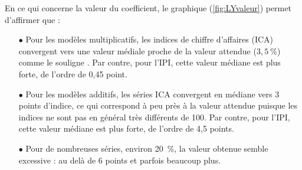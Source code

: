 \documentclass[12pt, a4paper, french]{article}
\begin{document}
En ce qui concerne la valeur du coefficient, le graphique (\ref{fig:LYvaleur}) permet d'affirmer que :
\begin{itemize}
	\item[$\bullet$] Pour les modèles multiplicatifs, les indices de chiffre d'affaires (ICA) convergent vers une valeur médiale proche de la valeur attendue ($3,5~\%$) comme le souligne \cite{B1992}. Par contre, pour l'IPI, cette valeur médiane est plus forte, de l'ordre de 0,45 point.
	\item[$\bullet$] Pour les modèles additifs, les séries ICA convergent en médiane vers 3 points d'indice, ce qui correspond à peu près à la valeur attendue puisque les indices ne sont pas en général très différents de 100. Par contre, pour l'IPI, cette valeur médiane est plus forte, de l'ordre de 4,5 points.
	\item[$\bullet$] Pour de nombreuses séries, environ 20~\%, la valeur obtenue semble excessive : au delà de 6 points et parfois beaucoup plus.
\end{itemize}
\end{document}
